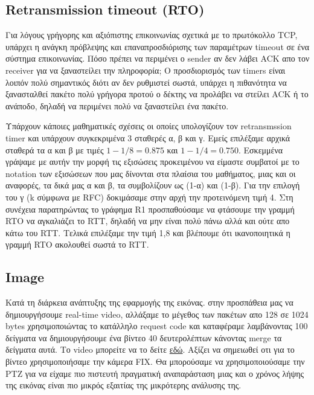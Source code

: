 \documentclass[hidelinks, 12pt, a4paper]{article}
\begin{document}
\subsection{Retransmission timeout (RTO)}


Για λόγους γρήγορης και αξιόπιστης επικοινωνίας σχετικά με το πρωτόκολλο TCP, υπάρχει η ανάγκη πρόβλεψης και επαναπροσδιόρισης των παραμέτρων timeout σε ένα σύστημα επικοινωνίας. Πόσο πρέπει να περιμένει ο sender αν δεν λάβει  ACK απο τον receiver για να ξαναστείλει την πληροφορία; Ο προσδιορισμός των timers είναι λοιπόν πολύ σημαντικός διότι αν δεν ρυθμιστεί σωστά, υπάρχει η πιθανότητα να ξανασταλθεί πακέτο πολύ γρήγορα προτού ο δέκτης να προλάβει να στείλει ACΚ ή το ανάποδο, δηλαδή να περιμένει πολύ να ξαναστείλει ένα πακέτο\cite{gfg_rto, saminir}. 

Υπάρχουν κάποιες μαθηματικές σχέσεις οι οποίες υπολογίζουν τον retransmssion timer και υπάρχουν συγκεκριμένα 3 σταθερές α, β και γ. Εμείς επιλέξαμε αρχικά σταθερά τα α και β με τιμές $1 - 1/8 = 0.875$ και $1 - 1/4 = 0.750$. Εσκεμμένα γράψαμε με αυτήν την μορφή τις εξισώσεις προκειμένου να είμαστε συμβατοί με το notation των εξισώσεων που μας δίνονται στα πλαίσια του μαθήματος, μιας και οι αναφορές\cite{rfc}, τα δικά μας α και β, τα συμβολίζουν ως (1-α) και (1-β). Για την επιλογή του γ (k σύμφωνα με RFC) δοκιμάσαμε στην αρχή την προτεινόμενη τιμή 4. Στη συνέχεια παρατηρώντας το γράφημα R1 προσπαθούσαμε να φτάσουμε την γραμμή RTO να αγκαλιάζει το RTT, δηλαδή να μην είναι πολύ πάνω αλλά και ούτε απο κάτω του RTT. Τελικά επιλέξαμε την τιμή 1,8 και βλέπουμε ότι ικανοποιητικά η γραμμή RTO ακολουθεί σωστά το RTT.



\subsection{Image}

Κατά τη διάρκεια ανάπτυξης της εφαρμογής της εικόνας. στην προσπάθεια μας να δημιουργήσουμε real-time video, αλλάξαμε το μέγεθος των πακέτων απο 128 σε 1024 bytes χρησιμοποιώντας το κατάλληλο request code και καταφέραμε λαμβάνοντας 100 δείγματα να δημιουργήσουμε ένα βίντεο 40 δευτερολέπτων κάνοντας merge τα δείγματα αυτά. Το video μπορείτε να το δείτε \href{https://drive.google.com/file/d/1yfwckvGBr8YteigF3ainMJMXwLOzjZ9u/view?usp=sharing}{εδώ}. Αξίζει να σημειωθεί οτι για το βίντεο χρησιμοποιήσαμε την κάμερα FIX. Θα μπορούσαμε να χρησιμοποιούσαμε την PTZ για να είχαμε πιο πιστευτή πραγματική αναπαράσταση μιας και ο χρόνος λήψης της εικόνας είναι πιο μικρός εξαιτίας της μικρότερης ανάλυσης της.
\end{document}
